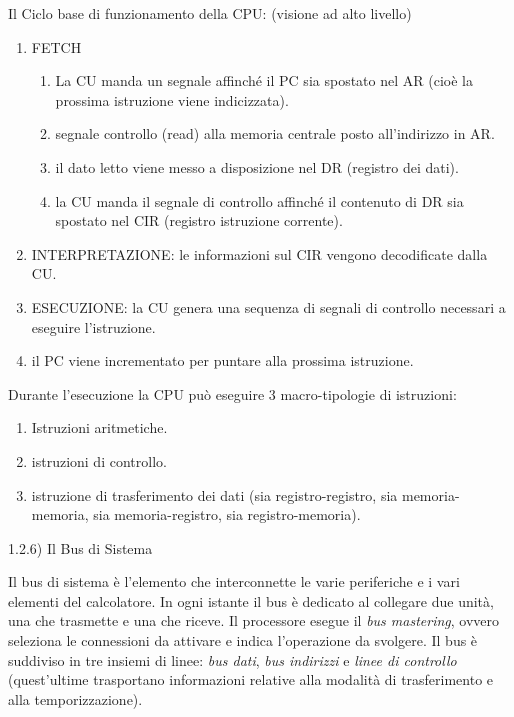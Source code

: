 \documentclass[
  paper=a4,
  oneside  ,captions=tableheading
]{scrbook}
\providecommand{\tightlist}{%
  \setlength{\itemsep}{0pt}\setlength{\parskip}{0pt}}
\begin{document}
Il Ciclo base di funzionamento della CPU: (visione ad alto livello)

\begin{enumerate}
\def\labelenumi{\arabic{enumi}.}
\tightlist
\item
  FETCH

  \begin{enumerate}
  \def\labelenumii{\arabic{enumii}.}
  \tightlist
  \item
    La CU manda un segnale affinché il PC sia spostato nel AR (cioè la
    prossima istruzione viene indicizzata).
  \item
    segnale controllo (read) alla memoria centrale posto all'indirizzo
    in AR.
  \item
    il dato letto viene messo a disposizione nel DR (registro dei dati).
  \item
    la CU manda il segnale di controllo affinché il contenuto di DR sia
    spostato nel CIR (registro istruzione corrente).
  \end{enumerate}
\item
  INTERPRETAZIONE: le informazioni sul CIR vengono decodificate dalla
  CU.
\item
  ESECUZIONE: la CU genera una sequenza di segnali di controllo
  necessari a eseguire l'istruzione.
\item
  il PC viene incrementato per puntare alla prossima istruzione.
\end{enumerate}

Durante l'esecuzione la CPU può eseguire 3 macro-tipologie di
istruzioni:

\begin{enumerate}
\def\labelenumi{\arabic{enumi}.}
\tightlist
\item
  Istruzioni aritmetiche.
\item
  istruzioni di controllo.
\item
  istruzione di trasferimento dei dati (sia registro-registro, sia
  memoria-memoria, sia memoria-registro, sia registro-memoria).
\end{enumerate}

1.2.6) Il Bus di Sistema

Il bus di sistema è l'elemento che interconnette le varie periferiche e
i vari elementi del calcolatore. In ogni istante il bus è dedicato al
collegare due unità, una che trasmette e una che riceve. Il processore
esegue il \emph{bus mastering}, ovvero seleziona le connessioni da
attivare e indica l'operazione da svolgere. Il bus è suddiviso in tre
insiemi di linee: \emph{bus dati}, \emph{bus indirizzi} e \emph{linee di
controllo} (quest'ultime trasportano informazioni relative alla modalità
di trasferimento e alla temporizzazione).
\end{document}
